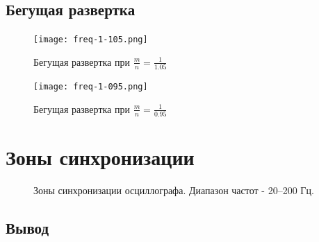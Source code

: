 \subsection{Бегущая развертка}
\begin{figure}[H]
	\centering
	\texttt{[image: freq-1-105.png]}
	\caption{Бегущая развертка при $\frac{m}{n}=\frac{1}{1.05}$}
	\label{fig:freq-1-1.05}
\end{figure}

\begin{figure}[H]
	\centering
	\texttt{[image: freq-1-095.png]}
	\caption{Бегущая развертка при $\frac{m}{n}=\frac{1}{0.95}$}
	\label{fig:freq-1-0.95}
\end{figure}


\section{Зоны синхронизации}
\begin{figure}[H]
	\centering
	\begin{tikzpicture}
	\hspace{-1cm}
				
	\end{tikzpicture}
	\caption{Зоны синхронизации осциллографа. Диапазон частот -  20--200 Гц.}
	\label{fig:figure1}
\end{figure}

\newpage
\subsection{Вывод}





